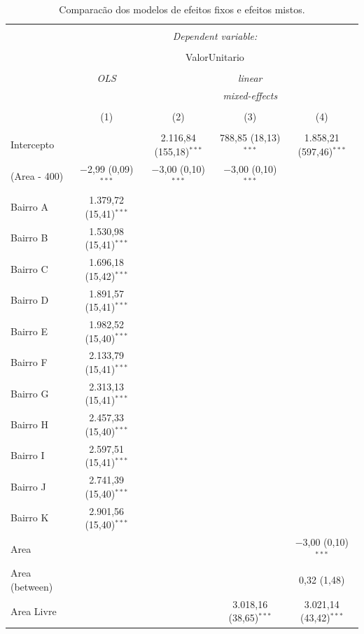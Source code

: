 \documentclass[
  a4paper, 12pt]{article}
\begin{document}
\begin{table}[H] \centering 
  \caption{Comparacão dos modelos de  efeitos fixos e efeitos mistos.} 
  \label{tab:fits} 
\scriptsize 
\begin{tabular}{@{\extracolsep{5pt}}lcccc} 
\\[-1.8ex]\hline 
\hline \\[-1.8ex] 
 & \multicolumn{4}{c}{\textit{Dependent variable:}} \\ 
\cline{2-5} 
\\[-1.8ex] & \multicolumn{4}{c}{ValorUnitario} \\ 
\\[-1.8ex] & \textit{OLS} & \multicolumn{3}{c}{\textit{linear}} \\ 
 & \textit{} & \multicolumn{3}{c}{\textit{mixed-effects}} \\ 
\\[-1.8ex] & (1) & (2) & (3) & (4)\\ 
\hline \\[-1.8ex] 
 Intercepto &  & 2.116,84 (155,18)$^{***}$ & 788,85 (18,13)$^{***}$ & 1.858,21 (597,46)$^{***}$ \\ 
  (Area - 400) & $-$2,99 (0,09)$^{***}$ & $-$3,00 (0,10)$^{***}$ & $-$3,00 (0,10)$^{***}$ &  \\ 
  Bairro A & 1.379,72 (15,41)$^{***}$ &  &  &  \\ 
  Bairro B & 1.530,98 (15,41)$^{***}$ &  &  &  \\ 
  Bairro C & 1.696,18 (15,42)$^{***}$ &  &  &  \\ 
  Bairro D & 1.891,57 (15,41)$^{***}$ &  &  &  \\ 
  Bairro E & 1.982,52 (15,40)$^{***}$ &  &  &  \\ 
  Bairro F & 2.133,79 (15,41)$^{***}$ &  &  &  \\ 
  Bairro G & 2.313,13 (15,41)$^{***}$ &  &  &  \\ 
  Bairro H & 2.457,33 (15,40)$^{***}$ &  &  &  \\ 
  Bairro I & 2.597,51 (15,41)$^{***}$ &  &  &  \\ 
  Bairro J & 2.741,39 (15,40)$^{***}$ &  &  &  \\ 
  Bairro K & 2.901,56 (15,40)$^{***}$ &  &  &  \\ 
  Area &  &  &  & $-$3,00 (0,10)$^{***}$ \\ 
  Area (between) &  &  &  & 0,32 (1,48) \\ 
  Area Livre &  &  & 3.018,16 (38,65)$^{***}$ & 3.021,14 (43,42)$^{***}$ \\ 

\end{tabular}
\end{table}
\end{document}
